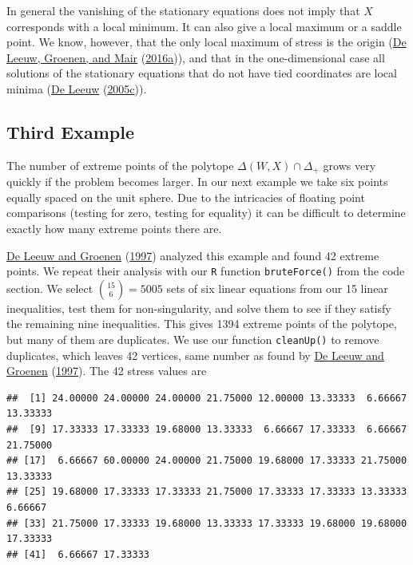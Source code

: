 \documentclass[
  12pt,
]{book}
\theoremstyle{definition}
\theoremstyle{definition}
\theoremstyle{definition}
\theoremstyle{definition}
\theoremstyle{remark}
\begin{document}
In general the vanishing of the stationary equations does not imply that \(X\) corresponds with a local minimum. It can also give a local maximum or a saddle point. We know, however, that the only local maximum of stress is the origin (\protect\hyperlink{ref-deleeuw_groenen_mair_E_16e}{De Leeuw, Groenen, and Mair} (\protect\hyperlink{ref-deleeuw_groenen_mair_E_16e}{2016a})), and that in the one-dimensional case all solutions of the stationary equations that do not have tied coordinates are local minima (\protect\hyperlink{ref-deleeuw_C_05h}{De Leeuw} (\protect\hyperlink{ref-deleeuw_C_05h}{2005c})).

\hypertarget{third-example}{%
\subsection{Third Example}\label{third-example}}

The number of extreme points of the polytope \(\Delta(W,X)\cap\Delta_+\) grows very quickly if the problem becomes larger. In our next example we take six points equally spaced on the unit sphere. Due to the intricacies of floating point comparisons (testing for zero, testing for equality)
it can be difficult to determine exactly how many extreme points there are.

\protect\hyperlink{ref-deleeuw_groenen_A_97}{De Leeuw and Groenen} (\protect\hyperlink{ref-deleeuw_groenen_A_97}{1997}) analyzed this example and found 42 extreme points. We repeat their analysis with our \texttt{R} function \texttt{bruteForce()} from the code section.
We select \(\binom{15}{6}=5005\) sets of six linear equations from our 15 linear inequalities, test them for non-singularity, and solve them to see if they satisfy the remaining nine inequalities. This gives 1394 extreme points of the polytope, but many of them are duplicates. We use
our function \texttt{cleanUp()} to remove duplicates, which leaves 42 vertices, same number as found by \protect\hyperlink{ref-deleeuw_groenen_A_97}{De Leeuw and Groenen} (\protect\hyperlink{ref-deleeuw_groenen_A_97}{1997}). The 42 stress values are

\begin{verbatim}
##  [1] 24.00000 24.00000 24.00000 21.75000 12.00000 13.33333  6.66667 13.33333
##  [9] 17.33333 17.33333 19.68000 13.33333  6.66667 17.33333  6.66667 21.75000
## [17]  6.66667 60.00000 24.00000 21.75000 19.68000 17.33333 21.75000 13.33333
## [25] 19.68000 17.33333 17.33333 21.75000 17.33333 17.33333 13.33333  6.66667
## [33] 21.75000 17.33333 19.68000 13.33333 17.33333 19.68000 19.68000 17.33333
## [41]  6.66667 17.33333
\end{verbatim}
\end{document}
